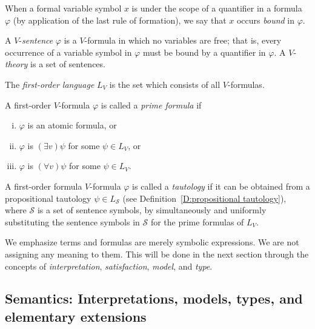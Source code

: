 \documentclass{scrartcl}
\renewcommand{\phi}{\varphi}
\begin{document}
When a formal variable symbol $x$ is under the scope of a quantifier in a formula $\phi$ (by application of the last rule of formation), we say that $x$ occurs \emph{bound} in $\phi$.



\begin{definition}
A $V$-\emph{sentence} $\varphi$ is a $V$-formula in which no variables are free; that is, every occurrence of a variable symbol in $\varphi$ must be bound by a quantifier in $\phi$. A $V$-\emph{theory} is a set of sentences.
\end{definition}

\begin{definition}
The \emph{first-order language} $L_V$ is the set which consists of all $V$-formulas.
\end{definition}

\begin{definition}
A first-order $V$-formula $\phi$ is called a \emph{prime formula} if
\begin{enumerate}[i)]
\item $\phi$ is an atomic formula, or
\item $\phi$ is $(\exists v)\psi$ for some $\psi\in L_V$, or
\item $\phi$ is $(\forall v)\psi$ for some $\psi\in L_V$.
\end{enumerate}

\end{definition}

\begin{definition}
\label{D:Tautology}
A first-order formula $V$-formula $\phi$ is called a \emph{tautology} if it can be obtained from a propositional tautology $\psi\in L_\mathscr{S}$ (see Definition~\ref{D:propositional tautology}), where $\mathscr{S}$ is a set of sentence symbols, by simultaneously and uniformly substituting the sentence symbols in $\mathscr{S}$ for the prime formulas of $L_V$.
\end{definition}

We emphasize terms and formulas are merely symbolic expressions. We are not assigning any meaning to them. This will be done in the next section through the concepts of \emph{interpretation}, \emph{satisfaction}, \emph{model}, and \emph{type}.


\subsection{Semantics: Interpretations, models, types, and elementary extensions}
\label{S:Semantics}
\end{document}
